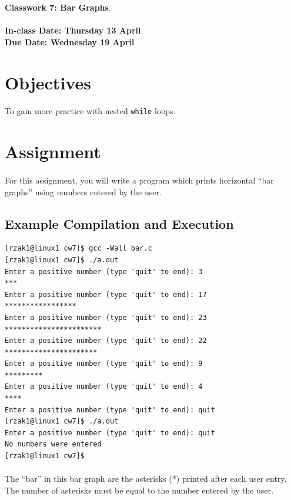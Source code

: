 \documentclass[letter,11pt]{article}
\begin{document}
\huge
\textbf{Classwork 7: Bar Graphs}.
\normalsize
\\ ~~ \\
\textbf{In-class Date: Thursday 13 April} \\
\textbf{Due Date: Wednesday 19 April}

\section*{Objectives}
\paragraph{}To gain more practice with nested \texttt{while} loops.

\section*{Assignment}
\paragraph{}For this assignment, you will write a program which prints horizontal ``bar graphs'' using numbers entered by the user.

\subsection*{Example Compilation and Execution}
\begin{verbatim}
[rzak1@linux1 cw7]$ gcc -Wall bar.c
[rzak1@linux1 cw7]$ ./a.out
Enter a positive number (type 'quit' to end): 3
***
Enter a positive number (type 'quit' to end): 17
*****************
Enter a positive number (type 'quit' to end): 23
***********************
Enter a positive number (type 'quit' to end): 22
**********************
Enter a positive number (type 'quit' to end): 9
*********
Enter a positive number (type 'quit' to end): 4
****
Enter a positive number (type 'quit' to end): quit
[rzak1@linux1 cw7]$ ./a.out
Enter a positive number (type 'quit' to end): quit
No numbers were entered
[rzak1@linux1 cw7]$
\end{verbatim}

\paragraph{}The ``bar'' in this bar graph are the asterisks (*) printed after each user entry. The number of asterisks must be equal to the number entered by the user.
\end{document}
